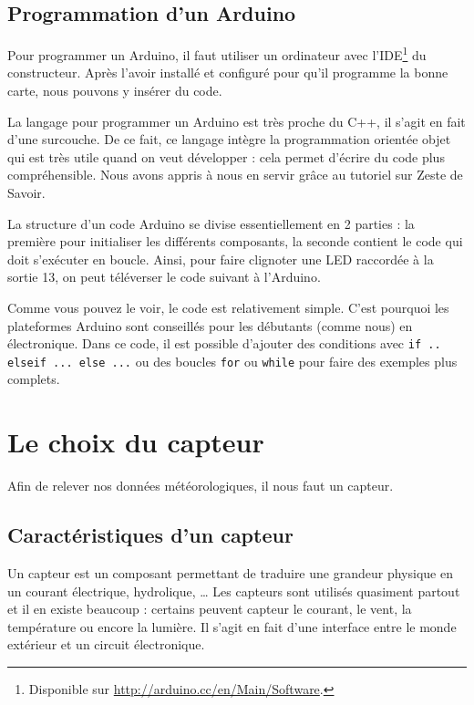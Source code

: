 \subsection{Programmation d'un Arduino}

Pour programmer un Arduino, il faut utiliser un ordinateur avec l'IDE\footnote{Disponible sur \url{http://arduino.cc/en/Main/Software}.} du constructeur. Après l'avoir installé et configuré pour qu'il programme la bonne carte, nous pouvons y insérer du code.

La langage pour programmer un Arduino est très proche du C++, il s'agit en fait d'une surcouche. De ce fait, ce langage intègre la programmation orientée objet qui est très utile quand on veut développer : cela permet d'écrire du code plus compréhensible. Nous avons appris à nous en servir grâce au tutoriel \cite{tuto-arduino} sur Zeste de Savoir.

La structure d'un code Arduino se divise essentiellement en 2 parties : la première pour initialiser les différents composants, la seconde contient le code qui doit s'exécuter en boucle. Ainsi, pour faire clignoter une LED raccordée à la sortie 13, on peut téléverser le code suivant à l'Arduino.


Comme vous pouvez le voir, le code est relativement simple. C'est pourquoi les plateformes Arduino sont conseillés pour les débutants (comme nous) en électronique. Dans ce code, il est possible d'ajouter des conditions avec \verb-if .. elseif ... else ...- ou des boucles \verb-for- ou \verb-while- pour faire des exemples plus complets.

\section{Le choix du capteur}

Afin de relever nos données météorologiques, il nous faut un capteur.

\subsection{Caractéristiques d'un capteur}

Un capteur est un composant permettant de traduire une grandeur physique en un courant électrique, hydrolique, \dots{} Les capteurs sont utilisés quasiment partout et il en existe beaucoup : certains peuvent capteur le courant, le vent, la température ou encore la lumière. Il s'agit en fait d'une interface entre le monde extérieur et un circuit électronique.

